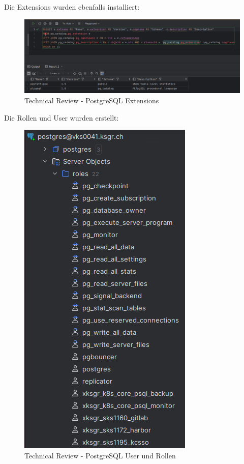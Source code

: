 \begin{flushleft}
    Die Extensions wurden ebenfalls installiert:
    \begin{figure}[H]
        \centering
        \includegraphics[width=1\linewidth]{source/implementation/construction_implementation/technical_review/extensions}
        \caption{Technical Review - PostgreSQL Extensions}
        \label{fig:extensions}
    \end{figure}
\end{flushleft}
\begin{flushleft}
    Die Rollen und User wurden erstellt:
    \begin{figure}[H]
        \centering
        \includegraphics[width=0.5\linewidth]{source/implementation/construction_implementation/technical_review/user_roles}
        \caption{Technical Review - PostgreSQL User und Rollen}
        \label{fig:user_roles}
    \end{figure}
\end{flushleft}
